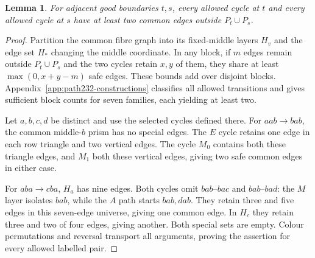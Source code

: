 \documentclass[11pt]{article}
\newtheorem{lemma}[theorem]{Lemma}
\theoremstyle{remark}
\numberwithin{equation}{section}
\numberwithin{table}{section}
\begin{document}
\begin{lemma}\label{lem:pathsafe}
For adjacent good boundaries $t,s$, every allowed cycle at $t$ and
every allowed cycle at $s$ have at least two common edges outside
$P_t\cup P_s$.
\end{lemma}
\begin{proof}
Partition the common fibre graph into its fixed-middle layers $H_v$
and the edge set $H_*$ changing the middle coordinate. In any block,
if $m$ edges remain outside $P_t\cup P_s$ and the two cycles retain
$x,y$ of them, they share at least $\max(0,x+y-m)$ safe edges.
These bounds add over disjoint blocks. Appendix~\ref{app:path232-constructions}
classifies all allowed transitions and gives sufficient block counts
for seven families, each yielding at least two.

Let $a,b,c,d$ be distinct and use the selected cycles defined there.
For $aab\to bab$, the common middle-$b$ prism has no special edges.
The $E$ cycle retains one edge in each row triangle and two vertical
edges. The cycle $M_0$ contains both these triangle edges, and $M_1$
both these vertical edges, giving two safe common edges in either case.

For $aba\to cba$, $H_a$ has nine edges. Both cycles omit
$bab$--$bac$ and $bab$--$bad$: the $M$ layer isolates $bab$, while
the $A$ path starts $bab,dab$. They retain three and five edges in
this seven-edge universe, giving one common edge. In $H_c$ they
retain three and two of four edges, giving another. Both special
sets are empty. Colour permutations and reversal transport all
arguments, proving the assertion for every allowed labelled pair.
\end{proof}
\end{document}
